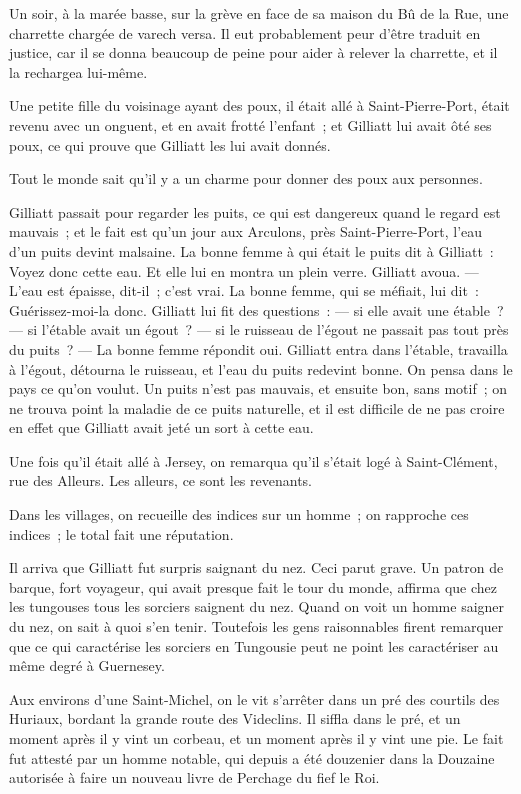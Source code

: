 \documentclass[french,twoside]{book} %
\begin{document}
 Un soir, à la marée basse, sur la grève en face de sa maison du Bû de la Rue, une charrette chargée de varech versa. Il eut probablement peur d’être traduit en justice, car il se donna beaucoup de peine pour aider à relever la charrette, et il la rechargea lui-même.\par
Une petite fille du voisinage ayant des poux, il était allé à Saint-Pierre-Port, était revenu avec un onguent, et en avait frotté l’enfant ; et Gilliatt lui avait ôté ses poux, ce qui prouve que Gilliatt les lui avait donnés.\par
Tout le monde sait qu’il y a un charme pour donner des poux aux personnes.\par
Gilliatt passait pour regarder les puits, ce qui est dangereux quand le regard est mauvais ; et le fait est qu’un jour aux Arculons, près Saint-Pierre-Port, l’eau d’un puits devint malsaine. La bonne femme à qui était le puits dit à Gilliatt : Voyez donc cette eau. Et elle lui en montra un plein verre. Gilliatt avoua. — L’eau est épaisse, dit-il ; c’est vrai. La bonne femme, qui se méfiait, lui dit : Guérissez-moi-la donc. Gilliatt lui fit des questions : — si elle avait une étable ? — si l’étable avait un égout ? — si le ruisseau de l’égout ne passait pas tout près du puits ? — La bonne femme répondit oui. Gilliatt entra dans l’étable, travailla à l’égout, détourna le ruisseau, et l’eau du puits redevint bonne. On pensa dans le pays ce qu’on voulut. Un puits n’est pas mauvais, et ensuite bon, sans motif ; on ne trouva point la maladie de ce puits naturelle, et il est difficile de ne pas croire en effet que Gilliatt avait jeté un sort à cette eau.\par
 Une fois qu’il était allé à Jersey, on remarqua qu’il s’était logé à Saint-Clément, rue des Alleurs. Les alleurs, ce sont les revenants.\par
Dans les villages, on recueille des indices sur un homme ; on rapproche ces indices ; le total fait une réputation.\par
Il arriva que Gilliatt fut surpris saignant du nez. Ceci parut grave. Un patron de barque, fort voyageur, qui avait presque fait le tour du monde, affirma que chez les tungouses tous les sorciers saignent du nez. Quand on voit un homme saigner du nez, on sait à quoi s’en tenir. Toutefois les gens raisonnables firent remarquer que ce qui caractérise les sorciers en Tungousie peut ne point les caractériser au même degré à Guernesey.\par
Aux environs d’une Saint-Michel, on le vit s’arrêter dans un pré des courtils des Huriaux, bordant la grande route des Videclins. Il siffla dans le pré, et un moment après il y vint un corbeau, et un moment après il y vint une pie. Le fait fut attesté par un homme notable, qui depuis a été douzenier dans la Douzaine autorisée à faire un nouveau livre de Perchage du fief le Roi.\par
\end{document}
